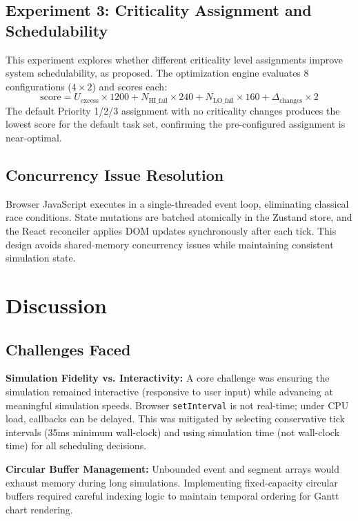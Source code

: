 \documentclass[conference]{IEEEtran}
\begin{document}
\subsection{Experiment 3: Criticality Assignment and Schedulability}

This experiment explores whether different criticality level assignments improve system schedulability, as proposed. The optimization engine evaluates 8 configurations ($4 \times 2$) and scores each:
\begin{equation}
  \text{score} = U_{\text{excess}} \times 1200 + N_{\text{HI\_fail}} \times 240 + N_{\text{LO\_fail}} \times 160 + \Delta_{\text{changes}} \times 2
\end{equation}
The default Priority 1/2/3 assignment with no criticality changes produces the lowest score for the default task set, confirming the pre-configured assignment is near-optimal.

\subsection{Concurrency Issue Resolution}
Browser JavaScript executes in a single-threaded event loop, eliminating classical race conditions. State mutations are batched atomically in the Zustand store, and the React reconciler applies DOM updates synchronously after each tick. This design avoids shared-memory concurrency issues while maintaining consistent simulation state.

\section{Discussion}

\subsection{Challenges Faced}

\textbf{Simulation Fidelity vs. Interactivity:} A core challenge was ensuring the simulation remained interactive (responsive to user input) while advancing at meaningful simulation speeds. Browser \texttt{setInterval} is not real-time; under CPU load, callbacks can be delayed. This was mitigated by selecting conservative tick intervals (35ms minimum wall-clock) and using simulation time (not wall-clock time) for all scheduling decisions.

\textbf{Circular Buffer Management:} Unbounded event and segment arrays would exhaust memory during long simulations. Implementing fixed-capacity circular buffers required careful indexing logic to maintain temporal ordering for Gantt chart rendering.
\end{document}
